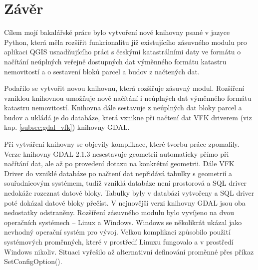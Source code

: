 \chapter{Závěr}
\label{5-zaver}

Cílem mojí bakalářské práce bylo vytvoření nové knihovny psané v
jazyce Python, která měla rozšířit funkcionalitu již existujícího
zásuvného modulu pro aplikaci QGIS usnadňujícího práci s českými
katastrálními daty ve formátu  o načítání neúplných veřejně
dostupných dat výměnného formátu katastru nemovitostí a o sestavení
bloků parcel a budov z načtených dat.

Podařilo se vytvořit novou knihovnu, která rozšiřuje zásuvný
modul. Rozšíření vzniklou knihovnou umožňuje nově načítání i neúplných
dat výměnného formátu katastru nemovitostí. Knihovna dále sestavuje z
neúplných dat bloky parcel a budov a ukládá je do databáze, která
vznikne při načtení dat VFK driverem (viz kap. \ref{subsec:gdal_vfk})
knihovny GDAL.

Při vytváření knihovny se objevily komplikace, které tvorbu práce
zpomalily. Verze knihovny GDAL 2.1.3 nesestavuje geometrii automaticky
přímo při načítání dat, ale až po provedení dotazu na konkrétní
geometrii. Dále VFK Driver do vzniklé databáze po načtení dat
nepřidává tabulky s geometrií a souřadnicovým systémem, tudíž vzniklá
databáze není prostorová a SQL driver nedokáže rozeznat datové
bloky. Tabulky byly v databázi vytvořeny a SQL driver poté dokázal
datové bloky přečíst. V nejnovější verzi knihovny GDAL jsou oba
nedostatky odstraněny. Rozšíření zásuvného modulu bylo vyvíjeno na
dvou operačních systémech -- Linux a Windows. Windows se několikrát
ukázal jako nevhodný operační systém pro vývoj. Velkou komplikaci
způsobilo použití systémových proměnných, které v prostředí Linuxu
fungovalo a v prostředí Windows nikoliv. Situaci vyřešilo až
alternativní definování proměnné přes příkaz SetConfigOption().

